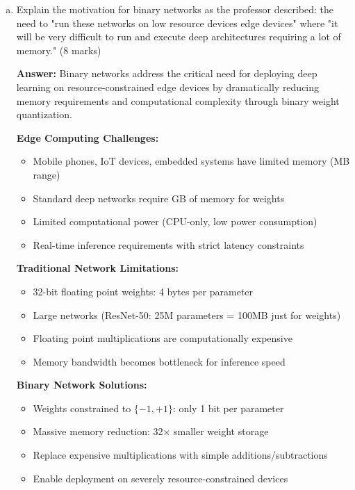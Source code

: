 \documentclass[12pt]{article}
\newcommand{\answer}[1]{{\color{answercolor}\textbf{Answer:} #1}}
\newcommand{\explanation}[1]{{\color{explanationcolor}#1}}
\begin{document}
\begin{enumerate}[(a)]
    \item Explain the motivation for binary networks as the professor described: the need to "run these networks on low resource devices edge devices" where "it will be very difficult to run and execute deep architectures requiring a lot of memory." \hfill (8 marks)
    
    \answer{Binary networks address the critical need for deploying deep learning on resource-constrained edge devices by dramatically reducing memory requirements and computational complexity through binary weight quantization.}
    
    \explanation{
    \textbf{Edge Computing Challenges:}
    \begin{itemize}
        \item Mobile phones, IoT devices, embedded systems have limited memory (MB range)
        \item Standard deep networks require GB of memory for weights
        \item Limited computational power (CPU-only, low power consumption)
        \item Real-time inference requirements with strict latency constraints
    \end{itemize}
    
    \textbf{Traditional Network Limitations:}
    \begin{itemize}
        \item 32-bit floating point weights: 4 bytes per parameter
        \item Large networks (ResNet-50: 25M parameters = 100MB just for weights)
        \item Floating point multiplications are computationally expensive
        \item Memory bandwidth becomes bottleneck for inference speed
    \end{itemize}
    
    \textbf{Binary Network Solutions:}
    \begin{itemize}
        \item Weights constrained to $\{-1, +1\}$: only 1 bit per parameter
        \item Massive memory reduction: 32× smaller weight storage
        \item Replace expensive multiplications with simple additions/subtractions
        \item Enable deployment on severely resource-constrained devices
    \end{itemize}
    
}
\end{enumerate}
\end{document}
